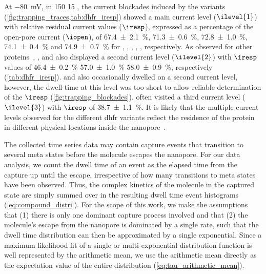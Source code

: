 At \SI{-80}{\mV}, in \SI{150}{\mM}  \SI{15}{\mM}  , the current blockades
induced by the  variants (\cref{fig:trapping_traces,tab:dhfr_iresp}) showed a main current level
($\ilevel{1}$) with relative residual current values ($\iresp$), expressed as a percentage of the open-pore
current ($\iopen$), of \SI{67.4 \pm 2.1}{\percent}, \SI{71.3 \pm 0.6}{\percent}, \SI{72.8 \pm 1.0}{\percent},
\SI{74.1 \pm 0.4}{\percent} and \SI{74.9 \pm 0.7}{\percent} for , , ,
, , respectively. As observed for other proteins~\cite{Soskine-2012,Soskine-2013,
Soskine-Biesemans-2015,Biesemans-2015}, ,  and  also displayed a second
current level ($\ilevel{2}$) with $\iresp$ values of \SI{46.4 \pm 0.2}{\percent} \SI{57.0 \pm 1.0}{\percent}
\SI{58.0 \pm 0.9}{\percent}, respectively (\cref{tab:dhfr_iresp}).  and  also
occasionally dwelled on a second current level, however, the dwell time at this level was too short to allow
reliable determination of the $\iresp$ (\cref{fig:trapping_blockades}).  often visited a third
current level ($\ilevel{3}$) with $\iresp$ of \SI{38.7\pm 1.1}{\percent}. It is likely that the multiple
current levels observed for the different \gls{dhfr} variants reflect the residence of the protein in
different physical locations inside the nanopore~\cite{Soskine-2012}.

The collected time series data may contain capture events that transition to several meta states before the
molecule escapes the nanopore. For our data analysis, we count the dwell time of an event as
the elapsed time from the capture up until the escape, irrespective of how many transitions to meta states
have been observed. Thus, the complex kinetics of the molecule in the captured state are simply summed over in
the resulting dwell time event histograms (\cref{eq:compound_distri}). For the scope of this work, we make the
assumptions that (1) there is only one dominant capture process involved and that (2) the molecule's escape
from the nanopore is dominated by a single rate, such that the dwell time distribution can then be
approximated by a single exponential. Since a maximum likelihood fit of a single or multi-exponential
distribution function is well represented by the arithmetic mean, we use the arithmetic mean directly as the
expectation value of the entire distribution (\cref{eq:tau_arithmetic_mean}).



